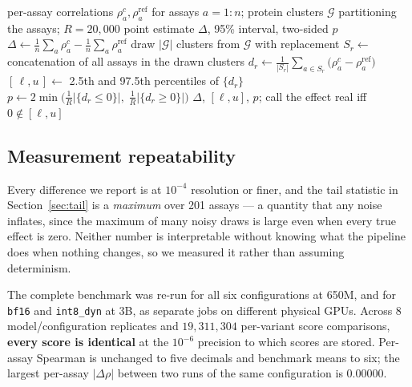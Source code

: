 \documentclass[11pt]{article}
\newcommand{\cfg}[1]{\texttt{#1}}
\begin{document}
\begin{algorithm}[htb]
\caption{Paired cluster bootstrap for $\Delta$(mean $\rho$) against the fp32
reference. Setting $\mathcal{G}$ to singletons recovers the ordinary
assay-level bootstrap; we report both.}
\label{alg:boot}
\begin{algorithmic}[1]
\Require per-assay correlations $\rho^{c}_{a}, \rho^{\text{ref}}_{a}$ for assays
         $a = 1{:}n$; protein clusters $\mathcal{G}$ partitioning the assays;
         $R = 20{,}000$
\Ensure point estimate $\Delta$, 95\% interval, two-sided $p$
\State $\Delta \gets \frac{1}{n}\sum_a \rho^{c}_{a} - \frac{1}{n}\sum_a \rho^{\text{ref}}_{a}$
  \State draw $|\mathcal{G}|$ clusters from $\mathcal{G}$ with replacement
  \State $S_r \gets$ concatenation of all assays in the drawn clusters
  \State $d_r \gets \frac{1}{|S_r|}\sum_{a \in S_r}\!\big(\rho^{c}_{a} - \rho^{\text{ref}}_{a}\big)$
         \label{ln:pair}
\EndFor
\State $[\,\ell, u\,] \gets$ 2.5th and 97.5th percentiles of $\{d_r\}$
\State $p \gets 2\min\!\big(\tfrac{1}{R}|\{d_r \le 0\}|,\; \tfrac{1}{R}|\{d_r \ge 0\}|\big)$
\State \Return $\Delta$, $[\ell, u]$, $p$; call the effect real iff $0 \notin [\ell, u]$
\end{algorithmic}
\end{algorithm}

\subsection{Measurement repeatability}
\label{sec:repeat}

Every difference we report is at $10^{-4}$ resolution or finer, and the tail
statistic in Section~\ref{sec:tail} is a \emph{maximum} over 201 assays --- a
quantity that any noise inflates, since the maximum of many noisy draws is large
even when every true effect is zero. Neither number is interpretable without
knowing what the pipeline does when nothing changes, so we measured it rather
than assuming determinism.

The complete benchmark was re-run for all six configurations at 650M, and for
\cfg{bf16} and \cfg{int8\_dyn} at 3B, as separate jobs on different physical
GPUs. Across 8 model/configuration replicates and $19{,}311{,}304$ per-variant score
comparisons, \textbf{every score is identical} at the $10^{-6}$ precision to
which scores are stored. Per-assay Spearman is unchanged to five decimals and
benchmark means to six; the largest per-assay $|\Delta\rho|$ between two runs of
the same configuration is $0.00000$.
\end{document}

